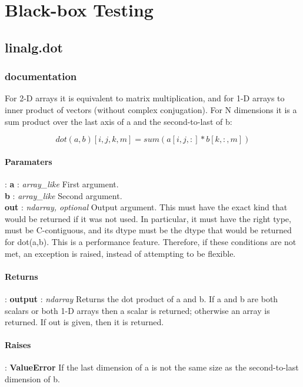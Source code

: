 \documentclass[a4paper,11pt]{article}
\begin{document}
\section{Black-box Testing}
\subsection{linalg.dot}
\subsubsection{documentation}
For 2-D arrays it is equivalent to matrix multiplication, and for 1-D arrays to inner product of vectors (without complex conjugation). For N dimensions it is a sum product over the last axis of a and the second-to-last of b:

    \begin{equation} dot(a, b)[i,j,k,m] = sum(a[i,j,:] * b[k,:,m]) \end{equation}
    
   \paragraph{Paramaters}: \textbf{a} : \textit{array\_like} First argument.\\
	\indent \hspace{2.2cm} \textbf{b} : \textit{array\_like} Second argument.\\
\indent \hspace{2.2cm} \textbf{out} : \textit{ndarray, optional} Output argument. This must have the exact kind that would be returned if it was not used. In particular, it must have the right type, must be C-contiguous, and its dtype must be the dtype that would be returned for dot(a,b). This is a performance feature. Therefore, if these conditions are not met, an exception is raised, instead of attempting to be flexible.
    \paragraph{Returns}:    \textbf{output} : \textit{ndarray}
Returns the dot product of a and b. If a and b are both scalars or both 1-D arrays then a scalar is returned; otherwise an array is returned. If out is given, then it is returned.\\

\paragraph{Raises}:
\textbf{ValueError}
If the last dimension of a is not the same size as the second-to-last dimension of b.
\end{document}
